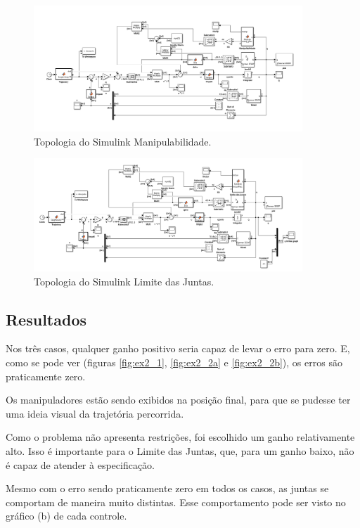 \documentclass[a4paper,11pt]{article}
\theoremstyle{mytheor}
\begin{document}
\begin{figure}[!ht]
\centering
\includegraphics[width=0.9\textwidth]{figs/ex2_2a_simulink}
\caption{Topologia do Simulink Manipulabilidade.}
\label{fig:ex2_2a_simulink}
\end{figure}

\begin{figure}[!ht]
\centering
\includegraphics[width=0.9\textwidth]{figs/ex2_2b_simulink}
\caption{Topologia do Simulink Limite das Juntas.}
\label{fig:ex2_2b_simulink}
\end{figure}

\subsection{Resultados}

Nos três casos, qualquer ganho positivo seria capaz de levar o erro para zero. E, como se pode ver (figuras \ref{fig:ex2_1}, \ref{fig:ex2_2a} e \ref{fig:ex2_2b}), os erros são praticamente zero.

Os manipuladores estão sendo exibidos na posição final, para que se pudesse ter uma ideia visual da trajetória percorrida.

Como o problema não apresenta restrições, foi escolhido um ganho relativamente alto. Isso é importante para o Limite das Juntas, que, para um ganho baixo, não é capaz de atender à especificação.

Mesmo com o erro sendo praticamente zero em todos os casos, as juntas se comportam de maneira muito distintas. Esse comportamento pode ser visto no gráfico (b) de cada controle.
\end{document}
